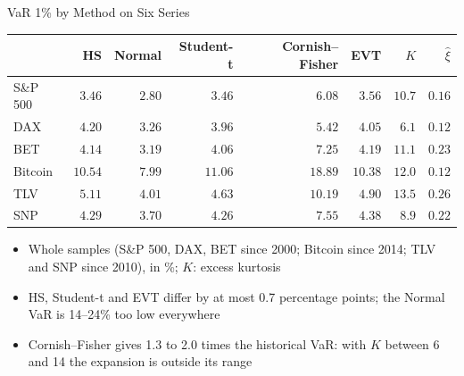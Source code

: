 \begin{frame}{VaR 1\% by Method on Six Series}
\itemsize{\footnotesize}
\begin{center}
\footnotesize
\begin{tabular}{lrrrrrrr}
\toprule
& HS & Normal & Student-t & Cornish--Fisher & EVT & $K$ & $\hat\xi$ \\
\midrule
S\&P 500 & $3.46$ & $2.80$ & $3.46$ & $6.08$ & $3.56$ & ${10.7}$ & $0.16$ \\
DAX & $4.20$ & $3.26$ & $3.96$ & $5.42$ & $4.05$ & ${6.1}$ & $0.12$ \\
BET & $4.14$ & $3.19$ & $4.06$ & $7.25$ & $4.19$ & ${11.1}$ & $0.23$ \\
Bitcoin & $10.54$ & $7.99$ & $11.06$ & $18.89$ & $10.38$ & ${12.0}$ & $0.12$ \\
TLV & $5.11$ & $4.01$ & $4.63$ & $10.19$ & $4.90$ & ${13.5}$ & $0.26$ \\
SNP & $4.29$ & $3.70$ & $4.26$ & $7.55$ & $4.38$ & ${8.9}$ & $0.22$ \\
\bottomrule
\end{tabular}
\end{center}
\begin{itemize}
    \item Whole samples (S\&P 500, DAX, BET since 2000; Bitcoin since 2014; TLV and SNP since 2010), in \%; $K$: excess kurtosis
    \item HS, Student-t and EVT differ by at most 0.7 percentage points; the Normal VaR is 14--24\% too low everywhere
    \item Cornish--Fisher gives 1.3 to 2.0 times the historical VaR: with $K$ between 6 and 14 the expansion is outside its range
\end{itemize}
\end{frame}

